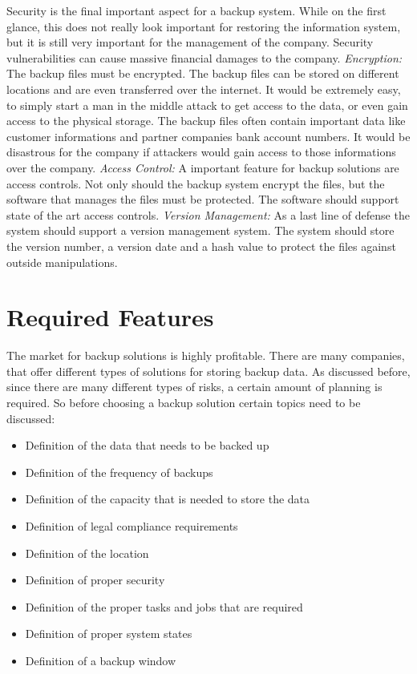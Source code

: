 \documentclass[12pt]{article}
\begin{document}
Security is the final important aspect for a backup system.  While on the first glance, this does not really look important for restoring the information system, but it is still very important for the management of the company. Security vulnerabilities can cause massive financial damages to the company.
\newline
\newline
\emph{Encryption:}
\newline
\newline
The backup files must be encrypted. The backup files can be stored on different locations and are even transferred over the internet. It would be extremely easy, to simply start a man in the middle attack to get access to the data, or even gain access to the physical storage. The backup files often contain important data like customer informations and partner companies bank account numbers. It would be disastrous for the company if attackers would gain access to those informations over the company.
\newline
\newline
\emph{Access Control:}
\newline
\newline
A important feature for backup solutions are access controls. Not only should the backup system encrypt the files, but the software that manages the files must be protected. The software should support state of the art access controls.
\newline
\newline
\emph{Version Management:}
\newline
\newline
As a last line of defense the system should support a version management system. The system should store the version number, a version date and a hash value to protect the files against outside manipulations. 
\newpage
\section{Required Features}
The market for backup solutions is highly profitable. There are many companies, that offer different types of solutions for storing backup data. As discussed before, since there are many different types of risks, a certain amount of planning is required. So before choosing a backup solution certain topics need to be discussed:
\begin{itemize}
\item Definition of the data that needs to be backed up
\item Definition of the frequency of backups 
\item Definition of the capacity that is needed to store the data
\item Definition of legal compliance requirements
\item Definition of the location
\item Definition of proper security
\item Definition of the proper tasks and jobs that are required
\item Definition of proper system states
\item Definition of a backup window   
\end{itemize}
\end{document}
